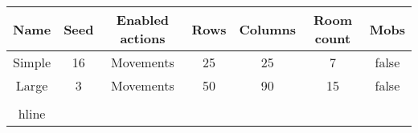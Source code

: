 \begin{tabular}{|c|c|c|c|c|c|c|}
\hline
Name & Seed & Enabled actions & Rows & Columns & Room count & Mobs\\
\hline
Simple & 16 & Movements & 25 & 25 & 7 & false\\
Large & 3 & Movements & 50 & 90 & 15 & false\\
\\hline\end{tabular}